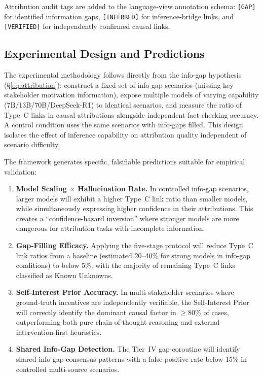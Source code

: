 Attribution audit tags are added to the language-view annotation schema:
\texttt{[GAP]} for identified information gaps, \texttt{[INFERRED]} for 
inference-bridge links, and \texttt{[VERIFIED]} for independently confirmed 
causal links.

\subsection{Experimental Design and Predictions}
\label{sec:experiments}

The experimental methodology follows directly from the info-gap hypothesis 
(\S\ref{eq:attribution}): construct a fixed set of info-gap scenarios 
(missing key stakeholder motivation information), expose multiple models of 
varying capability (7B/13B/70B/DeepSeek-R1) to identical scenarios, and 
measure the ratio of Type~C links in causal attributions alongside independent 
fact-checking accuracy. A control condition uses the same scenarios with 
info-gaps filled. This design isolates the effect of inference capability on 
attribution quality independent of scenario difficulty.

The framework generates specific, falsifiable predictions suitable for 
empirical validation:

\begin{enumerate}
  \item \textbf{Model Scaling $\times$ Hallucination Rate.} In controlled 
        info-gap scenarios, larger models will exhibit a higher Type~C link 
        ratio than smaller models, while simultaneously expressing higher 
        confidence in their attributions. This creates a ``confidence-hazard 
        inversion'' where stronger models are more dangerous for attribution 
        tasks with incomplete information.

  \item \textbf{Gap-Filling Efficacy.} Applying the five-stage protocol will 
        reduce Type~C link ratios from a baseline (estimated 20--40\% for strong 
        models in info-gap conditions) to below 5\%, with the majority of 
        remaining Type~C links classified as Known Unknowns.

  \item \textbf{Self-Interest Prior Accuracy.} In multi-stakeholder scenarios 
        where ground-truth incentives are independently verifiable, the 
        Self-Interest Prior will correctly identify the dominant causal factor 
        in $\geq 80\%$ of cases, outperforming both pure chain-of-thought 
        reasoning and external-intervention-first heuristics.

  \item \textbf{Shared Info-Gap Detection.} The Tier~IV gap-coroutine will 
        identify shared info-gap consensus patterns with a false positive rate 
        below 15\% in controlled multi-source scenarios.
\end{enumerate}

